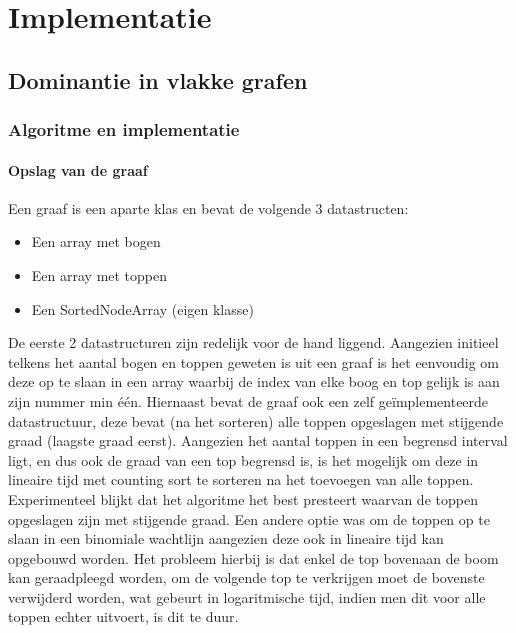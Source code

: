 \documentclass[11pt, a4paper, table]{article}
\theoremstyle{definition}
\begin{document}
\section{Implementatie}
\subsection{Dominantie in vlakke grafen}
\subsubsection{Algoritme en implementatie}
\paragraph{Opslag van de graaf}
Een graaf is een aparte klas en bevat de volgende 3 datastructen:
\begin{itemize}
	\item Een array met bogen
	\item Een array met toppen
	\item Een SortedNodeArray (eigen klasse)
\end{itemize}
De eerste 2 datastructuren zijn redelijk voor de hand liggend. Aangezien initieel telkens het aantal bogen en toppen geweten is uit een graaf is het eenvoudig om deze op te slaan in een array waarbij de index van elke boog en top gelijk is aan zijn nummer min \'{e}\'{e}n. Hiernaast bevat de graaf ook een zelf ge\"{i}mplementeerde datastructuur, deze bevat (na het sorteren) alle toppen opgeslagen met stijgende graad (laagste graad eerst). Aangezien het aantal toppen in een begrensd interval ligt, en dus ook de graad van een top begrensd is, is het mogelijk om deze in lineaire tijd met counting sort te sorteren na het toevoegen van alle toppen. Experimenteel blijkt dat het algoritme het best presteert waarvan de toppen opgeslagen zijn met stijgende graad. Een andere optie was om de toppen op te slaan in een binomiale wachtlijn aangezien deze ook in lineaire tijd kan opgebouwd worden. Het probleem hierbij is dat enkel de top bovenaan de boom kan geraadpleegd worden, om de volgende top te verkrijgen moet de bovenste verwijderd worden, wat gebeurt in logaritmische tijd, indien men dit voor alle toppen echter uitvoert, is dit te duur. 
\end{document}

